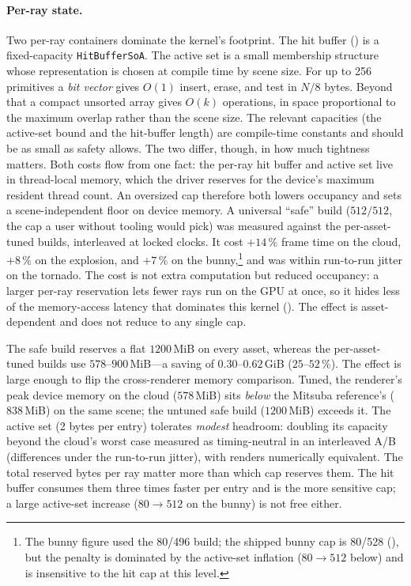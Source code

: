 \paragraph{Per-ray state.} Two per-ray containers dominate the kernel's footprint. The hit buffer
() is a fixed-capacity \texttt{HitBufferSoA}. The active set is a small membership
structure whose representation is chosen at compile time by scene size. For up to \num{256} primitives a
\emph{bit vector} gives $O(1)$ insert, erase, and test in $N/8$ bytes. Beyond that a compact unsorted
array gives $O(k)$ operations, in space proportional to the maximum overlap rather
than the scene size. The relevant capacities (the active-set bound and the hit-buffer length) are
compile-time constants and should be as small as safety allows. The two differ, though, in how much
tightness matters. Both costs flow from one fact: the per-ray hit buffer and active set live in thread-local memory,
which the driver reserves for the device's maximum resident thread count. An oversized cap therefore both
lowers occupancy and sets a scene-independent floor on device memory. A universal ``safe'' build
($512/512$, the cap a user without tooling would pick) was measured against the per-asset-tuned
builds, interleaved at locked clocks. It cost
$+14\,\%$ frame time on the cloud, $+8\,\%$ on the explosion, and
$+7\,\%$ on the bunny,\footnote{The bunny figure used the \num{80}/\num{496} build; the shipped bunny cap is \num{80}/\num{528} (), but the penalty is dominated by the active-set
inflation ($80\to512$ below) and is insensitive to the hit cap at this level.} and was within
run-to-run jitter on the tornado. The cost is not extra
computation but reduced occupancy: a larger per-ray reservation lets fewer rays run on the GPU at once,
so it hides less of the memory-access latency that dominates this kernel (). The
effect is asset-dependent and does not reduce to any single cap.

The safe build reserves a flat $1200\,$MiB on every asset,
whereas the per-asset-tuned builds use $578$--$900\,$MiB---a saving of $0.30$--$0.62\,$GiB
($25$--$52\,\%$). The effect is large enough to flip the cross-renderer memory comparison. Tuned, the
renderer's peak device memory on the cloud ($578\,$MiB) sits \emph{below} the Mitsuba reference's
($838\,$MiB) on the same scene; the untuned safe build ($1200\,$MiB) exceeds it. The active set
(\num{2} bytes per entry) tolerates \emph{modest} headroom: doubling its
capacity beyond the cloud's worst case measured as timing-neutral in an interleaved A/B (differences
under the run-to-run jitter), with renders numerically equivalent. The total reserved bytes
per ray matter more than which cap reserves them. The hit buffer consumes them three times faster per entry and is
the more sensitive cap; a large active-set increase ($80\to512$ on the bunny) is not free either.

